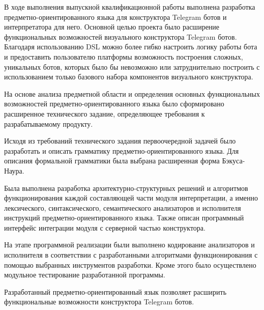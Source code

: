 \newpage


В ходе выполнения выпускной квалификационной работы выполнена разработка предметно-ориентированного языка для конструктора Telegram ботов и интерпретатора для него.
Основной целью проекта было расширение функциональных возможностей визуального конструктора Telegram ботов.
Благодаря использованию DSL можно более гибко настроить логику работы бота и предоставить пользователю платформы возможность построения сложных, уникальных ботов,
которых было бы невозможно или затруднительно построить с использованием только базового набора компонентов визуального конструктора.

На основе анализа предметной области и определения основных функциональных возможностей предметно-ориентированного языка было сформировано расширенное технического задание,
определяющее требования к разрабатываемому продукту.

Исходя из требований технического задания первоочередной задачей было разработать и описать грамматику предметно-ориентированного языка.
Для описания формальной грамматики была выбрана расширенная форма Бэкуса-Наура.

Была выполнена разработка архитектурно-структурных решений и алгоритмов функционирования каждой составляющей части модуля интерпретации,
а именно лексического, синтаксического, семантического анализаторов и исполнителя инструкций предметно-ориентированного языка.
Также описан программный интерфейс интеграции модуля с серверной частью конструктора.

На этапе программной реализации были выполнено кодирование анализаторов и исполнителя
в соответствии с разработанными алгоритмами функционирования с помощью выбранных инструментов разработки.
Кроме этого было осуществлено модульное тестирование разработанной программы.

Разработанный предметно-ориентированный язык позволяет расширить функциональные возможности конструктора Telegram ботов.